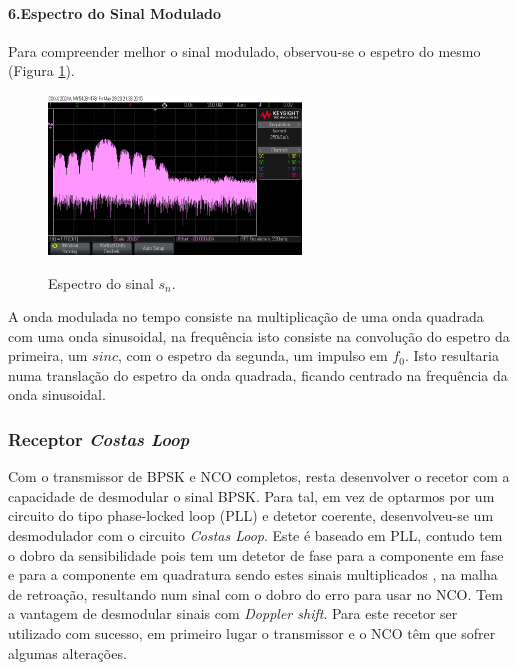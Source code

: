\documentclass[11pt]{article}
\numberwithin{equation}{section}
\begin{document}
	\paragraph{6.Espectro do Sinal Modulado} \hspace{0pt}
	\label{para:P2-6}
	
	Para compreender melhor o sinal modulado, observou-se o espetro do mesmo (Figura \ref{espetrosn}).
	\begin{figure}[H]
		\centering
		\includegraphics[width=0.6\textwidth]{./spectrum_sn_0-16k}~\\
		\caption{Espectro do sinal $s_n$.}
		\label{espetrosn}
	\end{figure}
	
	A onda modulada no tempo consiste na multiplicação de uma onda quadrada com uma onda sinusoidal, na frequência isto consiste na convolução do espetro da primeira, um $sinc$, com o espetro da segunda, um impulso em $f_0$. Isto resultaria numa translação do espetro da onda quadrada, ficando centrado na frequência da onda sinusoidal.
	
	\subsubsection{Receptor \textit{Costas Loop}}
	Com o transmissor de BPSK e NCO completos, resta desenvolver o recetor com a capacidade de desmodular o sinal BPSK. Para tal, em vez de optarmos por um circuito do tipo phase-locked loop (PLL) e detetor coerente, desenvolveu-se um desmodulador com o circuito \textit{Costas Loop}. Este é baseado em PLL, contudo tem o dobro da sensibilidade pois tem um detetor de fase para a componente em fase e para a componente em quadratura sendo estes sinais multiplicados , na malha de retroação, resultando num sinal com o dobro do erro para usar no NCO. Tem a vantagem de desmodular sinais com \textit{Doppler shift}. Para este recetor ser utilizado com sucesso, em primeiro lugar o transmissor e o NCO têm que sofrer algumas alterações.
	
\end{document}
